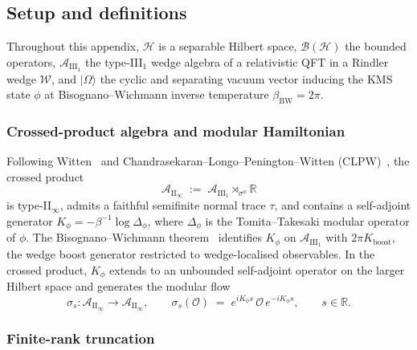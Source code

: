\documentclass[12pt,a4paper]{article}
\begin{document}
\subsection{Setup and definitions}
\label{ssec:A61-setup}

Throughout this appendix, $\mathcal{H}$ is a separable Hilbert space,
$\mathcal{B}(\mathcal{H})$ the bounded operators,
$\mathcal{A}_{\mathrm{III}_1}$ the type-III$_1$ wedge algebra of a
relativistic QFT in a Rindler wedge $\mathcal{W}$, and
$|\Omega\rangle$ the cyclic and separating vacuum vector inducing the
KMS state $\phi$ at Bisognano--Wichmann inverse temperature
$\beta_{\mathrm{BW}} = 2\pi$.

\subsubsection{Crossed-product algebra and modular Hamiltonian}
\label{sssec:A61-crossed}

Following Witten~\cite{Witten2022} and
Chandrasekaran--Longo--Penington--Witten (CLPW)~\cite{CLPW2023}, the
crossed product
\begin{equation}
  \mathcal{A}_{\mathrm{II}_\infty}
  \;:=\; \mathcal{A}_{\mathrm{III}_1} \rtimes_{\sigma^\phi} \mathbb{R}
  \label{eq:A61-crossed}
\end{equation}
is type-II$_\infty$, admits a faithful semifinite normal trace $\tau$,
and contains a self-adjoint generator
$K_\phi = -\beta^{-1}\log\Delta_\phi$, where $\Delta_\phi$ is the
Tomita--Takesaki modular operator of $\phi$.
The Bisognano--Wichmann theorem~\cite{BisognanoWichmann1976} identifies
$K_\phi$ on $\mathcal{A}_{\mathrm{III}_1}$ with $2\pi K_{\mathrm{boost}}$,
the wedge boost generator restricted to wedge-localised observables.
In the crossed product, $K_\phi$ extends to an unbounded self-adjoint
operator on the larger Hilbert space and generates the modular flow
\begin{equation}
  \sigma_s : \mathcal{A}_{\mathrm{II}_\infty} \to \mathcal{A}_{\mathrm{II}_\infty},
  \qquad
  \sigma_s(\mathcal{O}) \;=\; e^{i K_\phi s}\,\mathcal{O}\,e^{-i K_\phi s},
  \qquad s \in \mathbb{R}.
  \label{eq:A61-modflow}
\end{equation}

\subsubsection{Finite-rank truncation}
\label{sssec:A61-trunc}
\end{document}
